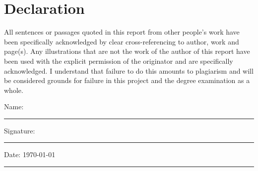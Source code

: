 

\section*{Declaration}
\label{section:declaration}

All sentences or passages quoted in this report from other people's work have been specifically
acknowledged by clear cross-referencing to author, work and page(s). Any illustrations that
are not the work of the author of this report have been used with the explicit permission
of the originator and are specifically acknowledged. I understand that failure to do this
amounts to plagiarism and will be considered grounds for failure in this project and the degree
examination as a whole.

\noindent Name: \student\\[1mm]
\rule[1em]{25em}{0.5pt}

\noindent Signature: \student\\[1mm]
\rule[1em]{25em}{0.5pt}

\noindent Date: \today\\[1mm]
\rule[1em]{25em}{0.5pt}

\newpage
